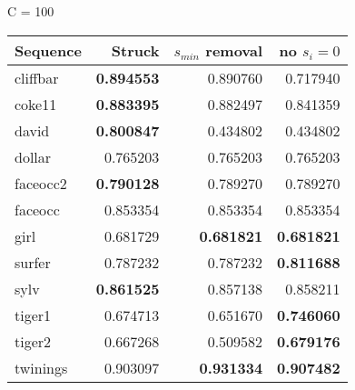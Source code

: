 C = 100

\begin{tabular}{l r r r}
    \toprule
    Sequence & Struck & \(s_{min}\) removal & no \(s_i = 0\) \\
    \midrule
    cliffbar & \textbf{0.894553} &         0.890760  &         0.717940  \\
    coke11   & \textbf{0.883395} &         0.882497  &         0.841359  \\
    david    & \textbf{0.800847} &         0.434802  &         0.434802  \\
    dollar   &         0.765203  &         0.765203  &         0.765203  \\
    faceocc2 & \textbf{0.790128} &         0.789270  &         0.789270  \\
    faceocc  &         0.853354  &         0.853354  &         0.853354  \\
    girl     &         0.681729  & \textbf{0.681821} & \textbf{0.681821} \\
    surfer   &         0.787232  &         0.787232  & \textbf{0.811688} \\
    sylv     & \textbf{0.861525} &         0.857138  &         0.858211  \\
    tiger1   &         0.674713  &         0.651670  & \textbf{0.746060} \\
    tiger2   &         0.667268  &         0.509582  & \textbf{0.679176} \\
    twinings &         0.903097  & \textbf{0.931334} & \textbf{0.907482} \\
    \bottomrule
\end{tabular}
